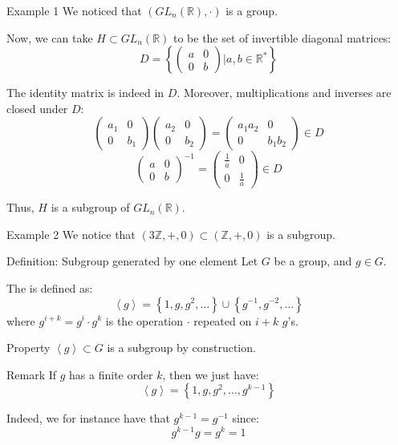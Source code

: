 \documentclass[a4paper]{article}
\begin{document}
\begin{parag}{Example 1}
    We noticed that $\left(GL_{n}\left(\mathbb{R}\right), \cdot \right)$ is a group. 

    Now, we can take $H \subset GL_{n}\left(\mathbb{R}\right)$ to be the set of invertible diagonal matrices: 
    \[D = \left\{\begin{pmatrix} a & 0 \\ 0 & b \end{pmatrix} | a, b \in \mathbb{R}^*\right\}\]
    
    The identity matrix is indeed in $D$. Moreover, multiplications and inverses are closed under $D$: 
    \[\begin{pmatrix} a_1 & 0 \\ 0 & b_1 \end{pmatrix} \begin{pmatrix} a_2 & 0 \\ 0 & b_2 \end{pmatrix} = \begin{pmatrix} a_1 a_2 & 0 \\ 0 & b_1 b_2 \end{pmatrix} \in D\] 
    \[\begin{pmatrix} a & 0 \\ 0 & b \end{pmatrix}^{-1} = \begin{pmatrix} \frac{1}{a} & 0 \\ 0 & \frac{1}{a} \end{pmatrix} \in D\]

    Thus, $H$ is a subgroup of $GL_n\left(\mathbb{R}\right)$.
\end{parag}

\begin{parag}{Example 2}
    We notice that $\left(3 \mathbb{Z}, +, 0\right) \subset \left(\mathbb{Z}, +, 0\right)$ is a subgroup.
\end{parag}

\begin{parag}{Definition: Subgroup generated by one element}
    Let $G$ be a group, and $g \in G$.

    The  is defined as: 
    \[\left\langle g \right\rangle = \left\{1, g, g^2, \ldots\right\} \cup \left\{g^{-1}, g^{-2}, \ldots\right\}\]
    where $g^{i+k} = g^i \cdot g^k$ is the operation $\cdot $ repeated on $i+k$ $g$'s.
    
    \begin{subparag}{Property}
        $\left\langle g \right\rangle \subset G$ is a subgroup by construction.
    \end{subparag}

    \begin{subparag}{Remark}
        If $g$ has a finite order $k$, then we just have: 
        \[\left\langle g \right\rangle = \left\{1, g, g^2, \ldots, g^{k-1}\right\}\]
        
        Indeed, we for instance have that $g^{k-1} = g^{-1}$ since: 
        \[g^{k-1} g = g^{k} = 1\]
    \end{subparag}
\end{parag}
\end{document}
